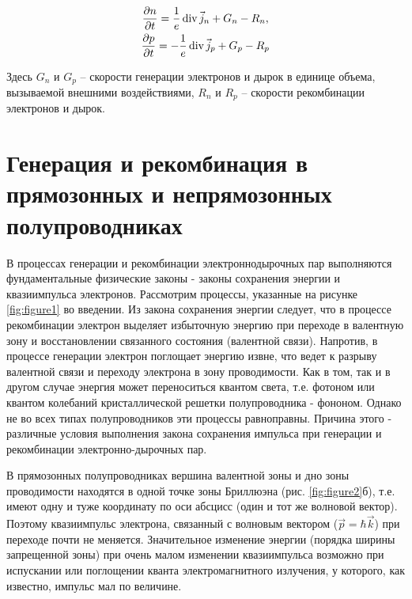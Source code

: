 \begin{gather}
	\label{eq2}
	\frac{\partial n}{\partial t}=\frac{1}{e} \operatorname{div} \vec{j}_{n}+G_{n}-R_{n},\\ \nonumber
	\frac{\partial p}{\partial t}=-\frac{1}{e} \operatorname{div} \vec{j}_{p}+G_{p}-R_{p}
\end{gather}

Здесь $G_n$ и $G_p$ -- скорости генерации электронов и дырок в единице объема, вызываемой внешними воздействиями, $R_n$ и $R_p$ -- скорости рекомбинации электронов и дырок.

\section{Генерация и рекомбинация в прямозонных и непрямозонных полупроводниках}

В процессах генерации и рекомбинации электроннодырочных пар выполняются фундаментальные физические законы - законы
сохранения энергии и квазиимпульса электронов. Рассмотрим процессы, указанные на рисунке \ref{fig:figure1} во введении.
Из закона сохранения энергии следует, что в процессе рекомбинации электрон выделяет избыточную энергию при переходе в
валентную зону и восстановлении связанного состояния (валентной связи). Напротив, в процессе генерации электрон
поглощает энергию извне, что ведет к разрыву валентной связи и переходу электрона в зону проводимости. Как в том, так и
в другом случае энергия может переноситься квантом света, т.е. фотоном или квантом колебаний кристаллической решетки
полупроводника - фононом. Однако не во всех типах полупроводников эти процессы равноправны. Причина этого - различные
условия выполнения закона сохранения импульса при генерации и рекомбинации электронно-дырочных пар.

В прямозонных полупроводниках вершина валентной зоны и дно зоны проводимости находятся в одной точке зоны Бриллюэна
(рис.  \ref{fig:figure2}б), т.е. имеют одну и туже координату по оси абсцисс (один и тот же волновой вектор). Поэтому
квазиимпульс электрона, связанный с волновым вектором ($\vec{p}=\hbar \vec{k}$) при переходе почти не меняется.
Значительное изменение энергии (порядка ширины запрещенной зоны) при очень малом изменении квазиимпульса возможно при
испускании или поглощении кванта электромагнитного излучения, у которого, как известно, импульс мал по величине.

